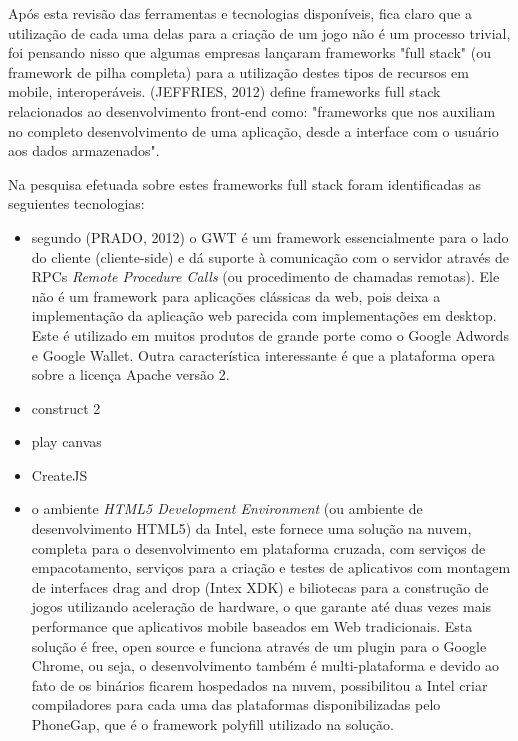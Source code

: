 \documentclass{article}
\begin{document}
Após esta revisão das ferramentas  e tecnologias disponíveis, fica claro que a utilização de cada uma delas para a criação de um jogo não é um processo trivial, foi pensando nisso que algumas empresas lançaram frameworks "full stack"  (ou framework de pilha completa) para a utilização destes tipos de recursos em mobile, interoperáveis. (JEFFRIES, 2012) define frameworks full stack relacionados ao desenvolvimento front-end como: "frameworks que nos auxiliam no completo desenvolvimento de uma aplicação, desde a interface com o usuário aos dados armazenados".

Na pesquisa efetuada sobre estes frameworks full stack foram identificadas as seguientes tecnologias:

\begin{itemize}

 \item segundo (PRADO, 2012) o GWT é um framework essencialmente para o lado do cliente (cliente-side) e dá suporte à comunicação com o servidor através de RPCs \textit{Remote Procedure Calls} (ou procedimento de chamadas remotas). Ele não é um framework para aplicações clássicas da web, pois deixa a implementação da
aplicação web parecida com implementações em desktop. Este é utilizado em muitos produtos de grande porte como o Google Adwords e Google Wallet. Outra característica interessante é que a plataforma opera sobre a licença Apache versão 2.
\item construct 2 
\item play canvas
\item CreateJS
 \item o ambiente  \textit{HTML5 Development Environment} (ou ambiente de desenvolvimento HTML5) da Intel, este fornece uma solução na nuvem, completa para o desenvolvimento em plataforma cruzada, com serviços de empacotamento, serviços para a criação e testes de aplicativos com montagem de interfaces drag and drop (Intex XDK) e biliotecas para a construção de jogos utilizando aceleração de hardware, o que garante até duas vezes mais performance que aplicativos mobile baseados em Web tradicionais. Esta solução é free, open source e funciona  através de um plugin para o Google Chrome, ou seja, o desenvolvimento também é multi-plataforma e devido ao fato de os binários ficarem hospedados na nuvem, possibilitou a  Intel criar compiladores para cada uma das plataformas disponibilizadas pelo PhoneGap, que é o framework polyfill utilizado na solução. 
\\\\
\end{itemize}
\end{document}
